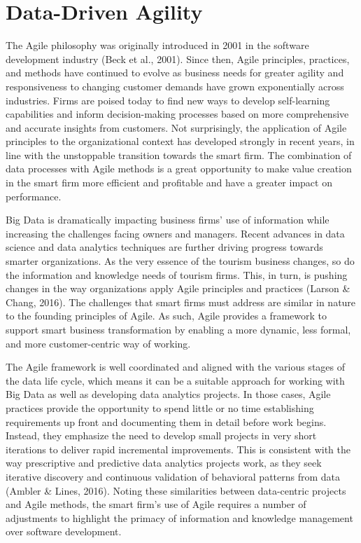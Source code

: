 \documentclass[
  letterpaper,
  DIV=11,
  numbers=noendperiod]{scrreprt}
\begin{document}
\hypertarget{data-driven-agility}{%
\chapter{Data-Driven Agility}\label{data-driven-agility}}

The Agile philosophy was originally introduced in 2001 in the software
development industry (Beck et al., 2001). Since then, Agile principles,
practices, and methods have continued to evolve as business needs for
greater agility and responsiveness to changing customer demands have
grown exponentially across industries. Firms are poised today to find
new ways to develop self-learning capabilities and inform
decision-making processes based on more comprehensive and accurate
insights from customers. Not surprisingly, the application of Agile
principles to the organizational context has developed strongly in
recent years, in line with the unstoppable transition towards the smart
firm. The combination of data processes with Agile methods is a great
opportunity to make value creation in the smart firm more efficient and
profitable and have a greater impact on performance.

Big Data is dramatically impacting business firms' use of information
while increasing the challenges facing owners and managers. Recent
advances in data science and data analytics techniques are further
driving progress towards smarter organizations. As the very essence of
the tourism business changes, so do the information and knowledge needs
of tourism firms. This, in turn, is pushing changes in the way
organizations apply Agile principles and practices (Larson \& Chang,
2016). The challenges that smart firms must address are similar in
nature to the founding principles of Agile. As such, Agile provides a
framework to support smart business transformation by enabling a more
dynamic, less formal, and more customer-centric way of working.

The Agile framework is well coordinated and aligned with the various
stages of the data life cycle, which means it can be a suitable approach
for working with Big Data as well as developing data analytics projects.
In those cases, Agile practices provide the opportunity to spend little
or no time establishing requirements up front and documenting them in
detail before work begins. Instead, they emphasize the need to develop
small projects in very short iterations to deliver rapid incremental
improvements. This is consistent with the way prescriptive and
predictive data analytics projects work, as they seek iterative
discovery and continuous validation of behavioral patterns from data
(Ambler \& Lines, 2016). Noting these similarities between data-centric
projects and Agile methods, the smart firm's use of Agile requires a
number of adjustments to highlight the primacy of information and
knowledge management over software development.
\end{document}
